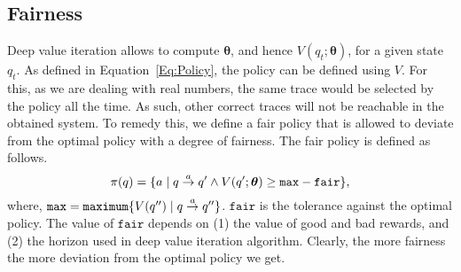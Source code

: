 


\subsection{Fairness}
Deep value iteration allows to compute $\bm{\theta}$, and hence $V(q_{t};\bm{\theta})$, for a given state $q_t$. As defined in Equation~\ref{Eq:Policy}, the policy can be defined using $V$. For this, as we are dealing with real numbers, the same trace would be selected by the policy all the time. As such, other correct traces will not be reachable in the obtained system. To remedy this, we define a fair policy that is allowed to deviate from the optimal policy with a degree of fairness.  The fair policy is defined as follows. 
\begin{equation}
\label{Eq:Policy}
\pi(q) = \{a \mid q \goesto[a] q' \wedge V(q';\bm{\theta}) \geq \mathtt{max} - \mathtt{fair}\},
\end{equation}
where, $\mathtt{max} = \mathtt{maximum}\{V(q'') \mid q \goesto[a] q''\}$.  $\mathtt{fair}$ is the tolerance against the optimal policy. The value of $\mathtt{fair}$ depends on (1) the value of good and bad rewards, and (2) the  horizon used in deep value iteration algorithm. Clearly, the more fairness the more deviation from the optimal policy we get. 